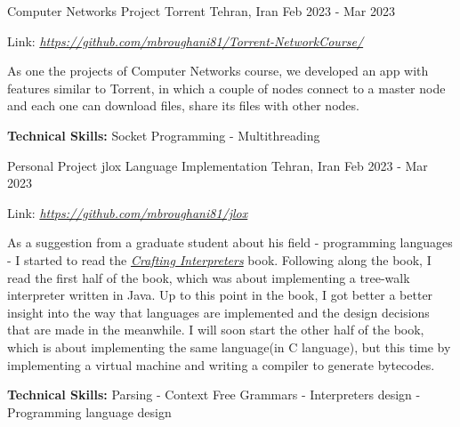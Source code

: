 

\begin{cventries}

  \cventry
  {Computer Networks Project} %
  {Torrent} %
  {Tehran, Iran} %
  {Feb 2023 - Mar 2023} %
  {
    \begin{cvitems} %
      \item {Link: \href{https://github.com/mbroughani81/Torrent-NetworkCourse/}{\textit{https://github.com/mbroughani81/Torrent-NetworkCourse/}}}
      \item {As one the projects of Computer Networks course, we developed an app with features similar to Torrent, in which a couple of nodes connect to a master node and each one can download files, share its files with other nodes.}
      \item {\textbf{Technical Skills:} Socket Programming - Multithreading}
    \end{cvitems}
  }

  \cventry
    {Personal Project} %
    {jlox Language Implementation} %
    {Tehran, Iran} %
    {Feb 2023 - Mar 2023} %
    {
      \begin{cvitems} %
        \item {Link: \href{https://github.com/mbroughani81/jlox}{\textit{https://github.com/mbroughani81/jlox}}}
        \item {As a suggestion from a graduate student about his field - programming languages - I started to read the \href{https://craftinginterpreters.com/}{\textit{Crafting Interpreters}} book. Following along the book, I read the first half of the book, which was about implementing a tree-walk interpreter written in Java. Up to this point in the book, I got better a better insight into the way that languages are implemented and the design decisions that are made in the meanwhile. I will soon start the other half of the book, which is about implementing the same language(in C language), but this time by implementing a virtual machine and writing a compiler to generate bytecodes.}
        \item {\textbf{Technical Skills:} Parsing - Context Free Grammars - Interpreters design - Programming language design}
      \end{cvitems}
    }


\end{cventries}
